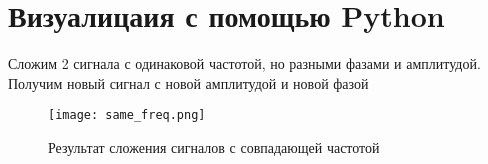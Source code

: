 \chapter{Визуалицаия с помощью Python}
\label{ch:chap3}

Сложим 2 сигнала с одинаковой частотой, но разными фазами и амплитудой. Получим новый сигнал с новой амплитудой и новой фазой

\begin{figure}[ht]
    \centering
    \texttt{[image: same\_freq.png]}
    \caption{Результат сложения сигналов с совпадающей частотой}
\end{figure}

\endinput